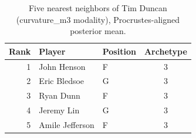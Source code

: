 \begin{table}[htbp]
  \centering\small
  \begin{tabular}{rllc}
    \toprule
    Rank & Player & Position & Archetype \\
    \midrule
    1 & John Henson & F & 3 \\
    2 & Eric Bledsoe & G & 3 \\
    3 & Ryan Dunn & F & 3 \\
    4 & Jeremy Lin & G & 3 \\
    5 & Amile Jefferson & F & 3 \\
    \bottomrule
  \end{tabular}
  \caption{Five nearest neighbors of Tim Duncan (curvature_m3 modality), Procrustes-aligned posterior mean.}
  \label{tab:Tim_Duncan_neighbors_curvature_m3}
\end{table}

